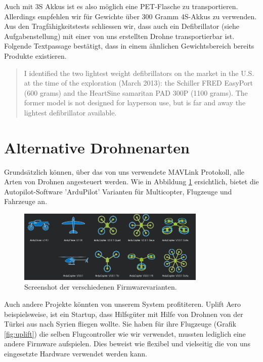 Auch mit 3S Akkus ist es also möglich eine PET-Flasche zu transportieren. Allerdings empfehlen wir für Gewichte über 300 Gramm 4S-Akkus zu verwenden.\\

Aus den Tragfähigkeitstests schliessen wir, dass auch ein Defibrillator (siehe Aufgabenstellung) mit einer von uns erstellten Drohne transportierbar ist. Folgende Textpassage \cite[p.3]{FleckUAV} bestätigt, dass in einem ähnlichen Gewichtsbereich bereits Produkte existieren.

\blockquote{I identified the two lightest weight defibrillators on the market in the U.S. at the time of the exploration (March 2013): the Schiller FRED EasyPort (600 grams) and the HeartSine samaritan PAD 300P (1100 grams). The former model is not designed for layperson use, but is far and away the lightest defibrillator available.} 



\newpage
	
\section{Alternative Drohnenarten}
\label{sec:drone-alternatives}

Grundsätzlich können, über das von uns verwendete \Gls{MAVLink} Protokoll, alle Arten von Drohnen angesteuert werden. Wie in Abbildung \ref{fig:arduScreenshot} ersichtlich, bietet die Autopilot-Software 'ArduPilot' Varianten für Multicopter, Flugzeuge und Fahrzeuge an.\\
\begin{figure}[H]
\centering
\includegraphics[width=0.8\textwidth] {images/arduScreenshot.jpg}
\caption{Screenshot der verschiedenen Firmwarevarianten.}
\label{fig:arduScreenshot}
\end{figure}

Auch andere Projekte könnten von unserem System profititeren. Uplift Aero beispielsweise, ist ein Startup, dass Hilfsgüter mit Hilfe von Drohnen von der Türkei aus nach Syrien fliegen wollte. Sie haben für ihre Flugzeuge (Grafik \ref{fig:uplift}) die selben Flugcontroller wie wir verwendet, mussten lediglich eine andere Firmware aufspielen. Dies beweist wie flexibel und vielseitig die von uns eingesetzte Hardware verwendet werden kann.

